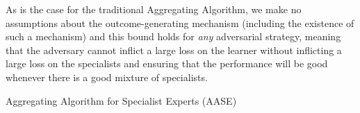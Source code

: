As is the case for the traditional Aggregating Algorithm, we make no assumptions about the outcome-generating mechanism (including the existence of such a mechanism) and this bound holds for \textit{any} adversarial strategy, meaning that the adversary cannot inflict a large loss on the learner without inflicting a large loss on the specialists and ensuring that the performance will be good whenever there is a good mixture of specialists.

\begin{algorithm}[H]
    \caption{Aggregating Algorithm for Specialist Experts (AASE)}\label{AASE}
    \begin{algorithmic}[1]
    \end{algorithmic}
\end{algorithm}